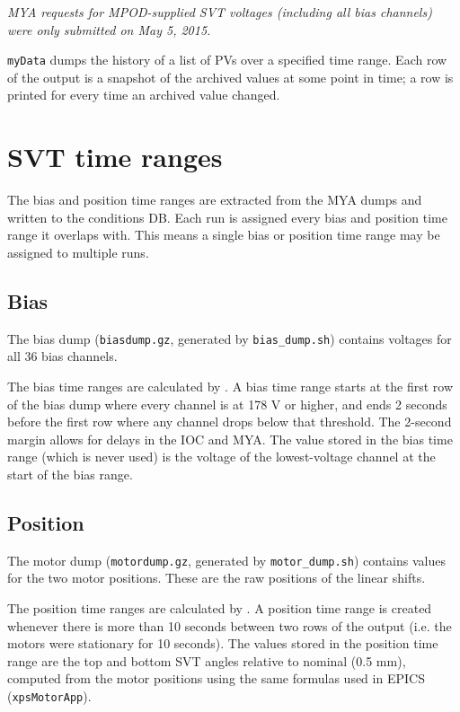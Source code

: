 \documentclass[aps,amsmath,amssymb,notitlepage,11pt,onecolumn]{revtex4-1}
\begin{document}
\emph{MYA requests for MPOD-supplied SVT voltages (including all bias channels) were only submitted on May 5, 2015.}

\texttt{myData} dumps the history of a list of PVs over a specified time range.
Each row of the output is a snapshot of the archived values at some point in time; a row is printed for every time an archived value changed.

\section{SVT time ranges}
The bias and position time ranges are extracted from the MYA dumps and written to the conditions DB.
Each run is assigned every bias and position time range it overlaps with.
This means a single bias or position time range may be assigned to multiple runs.

\subsection{Bias}
The bias dump (\texttt{biasdump.gz}, generated by \texttt{bias\_dump.sh}) contains voltages for all 36 bias channels.

The bias time ranges are calculated by .
A bias time range starts at the first row of the bias dump where every channel is at 178 V or higher, and ends 2 seconds before the first row where any channel drops below that threshold.
The 2-second margin allows for delays in the IOC and MYA.
The value stored in the bias time range (which is never used) is the voltage of the lowest-voltage channel at the start of the bias range.

\subsection{Position}
The motor dump (\texttt{motordump.gz}, generated by \texttt{motor\_dump.sh}) contains values for the two motor positions.
These are the raw positions of the linear shifts.

The position time ranges are calculated by .
A position time range is created whenever there is more than 10 seconds between two rows of the output (i.e. the motors were stationary for 10 seconds).
The values stored in the position time range are the top and bottom SVT angles relative to nominal (0.5 mm), computed from the motor positions using the same formulas used in EPICS (\texttt{xpsMotorApp}).
\end{document}
